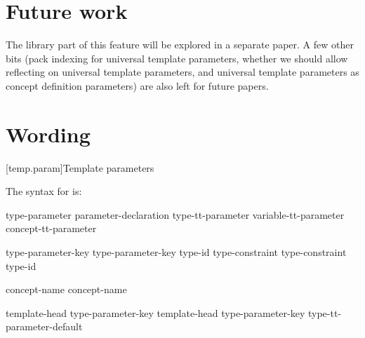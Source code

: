\documentclass{wg21}
\begin{document}
\section{Future work}

The library part of this feature will be explored in a separate paper.
A few other bits (pack indexing for universal template parameters, whether we should allow reflecting on universal template parameters,
and universal template parameters as concept definition parameters) are also left for future papers.


\section{Wording}

[temp.param]{Template parameters}

\pnum
The syntax for
is:

\begin{bnf}
    \br
    type-parameter\br
    parameter-declaration\br
    type-tt-parameter\br
    variable-tt-parameter\br
    concept-tt-parameter\br
\end{bnf}

\begin{bnf}
    \br
    type-parameter-key  \br
    type-parameter-key  \terminal{=} type-id\br
    type-constraint  \br
    type-constraint  \terminal{=} type-id
\end{bnf}

\begin{bnf}
    \br
    \br
\end{bnf}

\begin{bnf}
    \br
     concept-name\br
     concept-name \terminal{<}  \terminal{>}
\end{bnf}

\begin{bnf}
    \br
    template-head type-parameter-key  \br
    template-head type-parameter-key  type-tt-parameter-default
\end{bnf}
\end{document}
